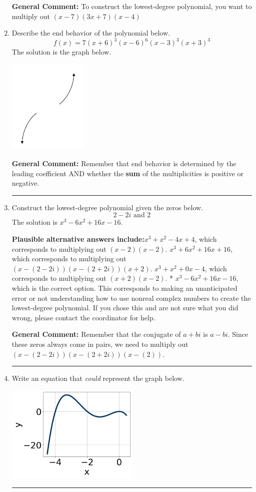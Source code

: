 \documentclass{extbook}[14pt]
\newcommand{\litem}[1]{\item #1

\rule{\textwidth}{0.4pt}}
\begin{document}
\begin{enumerate}
{\textbf{General Comment:} To construct the lowest-degree polynomial, you want to multiply out $(x -7)(3x + 7)(x -4)$
}
\litem{
Describe the end behavior of the polynomial below.
\[ f(x) = 7(x + 6)^{3}(x - 6)^{6}(x - 3)^{3}(x + 3)^{3} \]The solution is the graph below.
    \begin{center}
        \includegraphics[width=0.3\textwidth]{../Figures/polyEndBehaviorCopyDC.png}
    \end{center}

\textbf{General Comment:} Remember that end behavior is determined by the leading coefficient AND whether the \textbf{sum} of the multiplicities is positive or negative.
}
\litem{
Construct the lowest-degree polynomial given the zeros below.
\[ 2 - 2 i \text{ and } 2 \]The solution is \( x^{3} -6 x^{2} +16 x -16 \).\begin{enumerate}[label=\Alph*.]
\textbf{Plausible alternative answers include:}$x^{3} + x^{2} -4 x + 4$, which corresponds to multiplying out $(x -2)(x -2)$.
$x^{3} +6 x^{2} +16 x + 16$, which corresponds to multiplying out $(x-(2 - 2 i))(x-(2 + 2 i))(x + 2)$.
$x^{3} + x^{2} +0 x -4$, which corresponds to multiplying out $(x + 2)(x -2)$.
* $x^{3} -6 x^{2} +16 x -16$, which is the correct option.
This corresponds to making an unanticipated error or not understanding how to use nonreal complex numbers to create the lowest-degree polynomial. If you chose this and are not sure what you did wrong, please contact the coordinator for help.
\end{enumerate}

\textbf{General Comment:} Remember that the conjugate of $a+bi$ is $a-bi$. Since these zeros always come in pairs, we need to multiply out $(x-(2 - 2 i))(x-(2 + 2 i))(x-(2))$.
}
\litem{
Write an equation that \textit{could} represent the graph below.

\begin{center}
    \includegraphics[width=0.5\textwidth]{../Figures/polyGraphToFunctionCopyC.png}
\end{center}


}
\end{enumerate}
\end{document}
